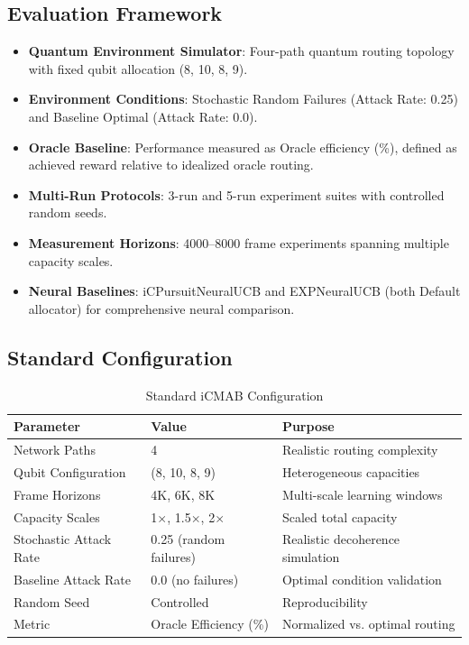 \documentclass[12pt,a4paper]{article}
\begin{document}
\subsection{Evaluation Framework}
\begin{itemize}
\item \textbf{Quantum Environment Simulator}: Four-path quantum routing topology with fixed qubit allocation (8, 10, 8, 9).
\item \textbf{Environment Conditions}: Stochastic Random Failures (Attack Rate: 0.25) and Baseline Optimal (Attack Rate: 0.0).
\item \textbf{Oracle Baseline}: Performance measured as Oracle efficiency (\%), defined as achieved reward relative to idealized oracle routing.
\item \textbf{Multi-Run Protocols}: 3-run and 5-run experiment suites with controlled random seeds.
\item \textbf{Measurement Horizons}: 4000--8000 frame experiments spanning multiple capacity scales.
\item \textbf{Neural Baselines}: iCPursuitNeuralUCB and EXPNeuralUCB (both Default allocator) for comprehensive neural comparison.
\end{itemize}

\subsection{Standard Configuration}
\begin{table}[H]
\centering
\caption{Standard iCMAB Configuration}
\begin{tabular}{@{}lll@{}}
\toprule
\textbf{Parameter} & \textbf{Value} & \textbf{Purpose} \\
\midrule
Network Paths & 4 & Realistic routing complexity \\
Qubit Configuration & (8, 10, 8, 9) & Heterogeneous capacities \\
Frame Horizons & 4K, 6K, 8K & Multi-scale learning windows \\
Capacity Scales & 1$\times$, 1.5$\times$, 2$\times$ & Scaled total capacity \\
Stochastic Attack Rate & 0.25 (random failures) & Realistic decoherence simulation \\
Baseline Attack Rate & 0.0 (no failures) & Optimal condition validation \\
Random Seed & Controlled & Reproducibility \\
Metric & Oracle Efficiency (\%) & Normalized vs. optimal routing \\
\bottomrule
\end{tabular}
\end{table}
\end{document}
